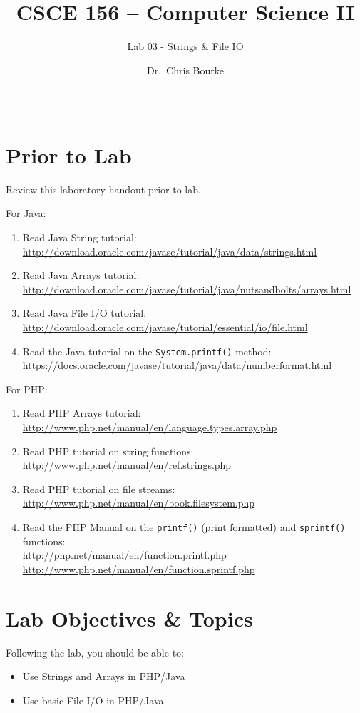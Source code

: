 \documentclass[12pt]{scrartcl}
\title{CSCE 156 -- Computer Science II}
\subtitle{Lab 03 - Strings \& File IO}
\author{Dr.\ Chris Bourke}
\date{~}
\begin{document}
\maketitle

\section*{Prior to Lab}

Review this laboratory handout prior to lab.

For Java:
\begin{enumerate}
  \item Read Java String tutorial: \\
	\url{http://download.oracle.com/javase/tutorial/java/data/strings.html}
  \item Read Java Arrays tutorial: \\
	\url{http://download.oracle.com/javase/tutorial/java/nutsandbolts/arrays.html}
  \item Read Java File I/O tutorial: \\
  	\url{http://download.oracle.com/javase/tutorial/essential/io/file.html}
  \item Read the Java tutorial on the \texttt{System.printf()} 
	method: \\
	\url{https://docs.oracle.com/javase/tutorial/java/data/numberformat.html}
\end{enumerate}

For PHP:
\begin{enumerate}
  \item Read PHP Arrays tutorial: \\
    \url{http://www.php.net/manual/en/language.types.array.php}
  \item Read PHP tutorial on string functions: \\
	\url{http://www.php.net/manual/en/ref.strings.php}
  \item Read PHP tutorial on file streams: \\
	\url{http://www.php.net/manual/en/book.filesystem.php}
  \item Read the PHP Manual on the \texttt{printf()} 
    (print formatted) and \texttt{sprintf()} functions:\\
	\url{http://php.net/manual/en/function.printf.php}\\
	\url{http://www.php.net/manual/en/function.sprintf.php}
\end{enumerate}

\section*{Lab Objectives \& Topics}
Following the lab, you should be able to:
\begin{itemize}
  \item Use Strings and Arrays in PHP/Java
  \item Use basic File I/O in PHP/Java
\end{itemize}
\end{document}
